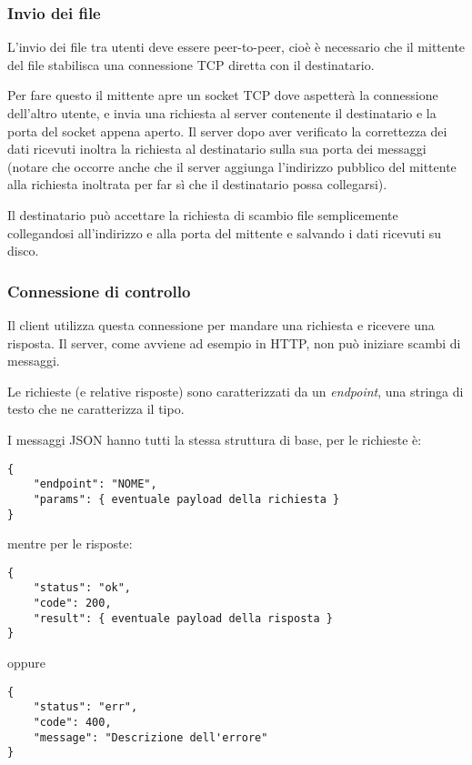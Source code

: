 \subsubsection{Invio dei file}
L'invio dei file tra utenti deve essere peer-to-peer, cioè è necessario che il mittente del file stabilisca una connessione TCP diretta con il destinatario.

Per fare questo il mittente apre un socket TCP dove aspetterà la connessione dell'altro utente, e invia una richiesta al server contenente il destinatario e la porta del socket appena aperto. Il server dopo aver verificato la correttezza dei dati ricevuti inoltra la richiesta al destinatario sulla sua porta dei messaggi (notare che occorre anche che il server aggiunga l'indirizzo pubblico del mittente alla richiesta inoltrata per far sì che il destinatario possa collegarsi).

Il destinatario può accettare la richiesta di scambio file semplicemente collegandosi all'indirizzo e alla porta del mittente e salvando i dati ricevuti su disco.

\subsubsection{Connessione di controllo}
Il client utilizza questa connessione per mandare una richiesta e ricevere una risposta. Il server, come avviene ad esempio in HTTP, non può iniziare scambi di messaggi.

Le richieste (e relative risposte) sono caratterizzati da un \textit{endpoint}, una stringa di testo che ne caratterizza il tipo.

I messaggi JSON hanno tutti la stessa struttura di base, per le richieste è:
\begin{verbatim}
{
    "endpoint": "NOME",
    "params": { eventuale payload della richiesta }
}
\end{verbatim}

mentre per le risposte:
\begin{verbatim}
{
    "status": "ok",
    "code": 200,
    "result": { eventuale payload della risposta }
}
\end{verbatim}

oppure
\begin{verbatim}
{
    "status": "err",
    "code": 400,
    "message": "Descrizione dell'errore"
}
\end{verbatim}

\medskip
